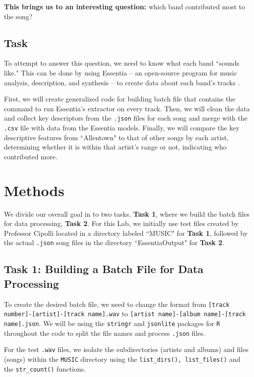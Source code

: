 \documentclass{article}\usepackage[]{graphicx}\usepackage[]{xcolor}
\begin{document}
\begin{multicols}{2}
\textbf{This brings us to an interesting question:} which band contributed most to the song?
 
 
\subsection{Task}
  To attempt to answer this question, we need to know what each band ``sounds like." This can be done by using Essentia -- an open-source program for music analysis, description, and synthesis -- to create data about each band's tracks \citep{Essentia}. 
  
  First, we will create generalized code for building batch file that contains the command to run Essentia's extractor on every track. Then, we will clean the data and collect key descriptors from the \texttt{.json} files for each song and merge with the \texttt{.csv} file with data from the Essentia models. Finally, we will compare the key descriptive features from ``Allentown" to that of other songs by each artist, determining whether it is within that artist's range or not, indicating who contributed more. 



\section{Methods}
  We divide our overall goal in to two tasks. \textbf{Task 1}, where we build the batch files for data processing, \textbf{Task 2}. For this Lab, we initially use test files created by Professor Cipolli located in a directory labeled ``MUSIC" for \textbf{Task 1}, followed by the actual \texttt{.json} song files in the directory ``EssentiaOutput" for \textbf{Task 2}.


\subsection{Task 1: Building a Batch File for Data Processing}
  To create the desired batch file, we need to change the format from \texttt{[track number]-[artist]-[track name].wav} to \texttt{[artist name]-[album name]-[track name].json}. We will be using the \texttt{stringr} \citep{stringr} and \texttt{jsonlite} \citep{jsonlite} packages for \texttt{R} throughout the code to split the file names and process \texttt{.json} files.
  







For the test \texttt{.wav} files, we isolate the subdirectories (artists and albums) and files (songs) within the \texttt{MUSIC} directory using the \texttt{list\_dirs(), list\_files()} and the \texttt{str\_count()} functions.








\end{multicols}
\end{document}
